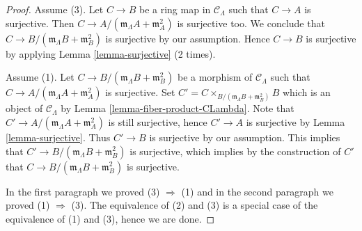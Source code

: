 \begin{proof}
Assume (3). Let $C \to B$ be a ring map in $\mathcal{C}_\Lambda$ such
that $C \to A$ is surjective. Then
$C \to A/(\mathfrak m_\Lambda A + \mathfrak m_A^2)$ is surjective
too. We conclude that $C \to B/(\mathfrak m_\Lambda B + \mathfrak m_B^2)$
is surjective by our assumption. Hence $C \to B$ is surjective by applying
Lemma \ref{lemma-surjective} (2 times).

\medskip\noindent
Assume (1). Let $C \to B/(\mathfrak m_\Lambda B + \mathfrak m_B^2)$
be a morphism of $\mathcal{C}_\Lambda$ such that
$C \to A/(\mathfrak m_\Lambda A + \mathfrak m_A^2)$ is surjective. Set
$C' = C \times_{B/(\mathfrak m_\Lambda B + \mathfrak m_B^2)} B$
which is an object of $\mathcal{C}_\Lambda$ by
Lemma \ref{lemma-fiber-product-CLambda}.
Note that $C' \to A/(\mathfrak m_\Lambda A + \mathfrak m_A^2)$
is still surjective, hence $C' \to A$ is surjective by
Lemma \ref{lemma-surjective}.
Thus $C' \to B$ is surjective by our assumption. This implies
that $C' \to B/(\mathfrak m_\Lambda B + \mathfrak m_B^2)$ is
surjective, which implies by the construction of $C'$ that
$C \to B/(\mathfrak m_\Lambda B + \mathfrak m_B^2)$ is surjective.

\medskip\noindent
In the first paragraph we proved (3) $\Rightarrow$ (1) and in the second
paragraph we proved (1) $\Rightarrow$ (3). The equivalence of
(2) and (3) is a special case of the equivalence of (1) and (3), hence
we are done.
\end{proof}

